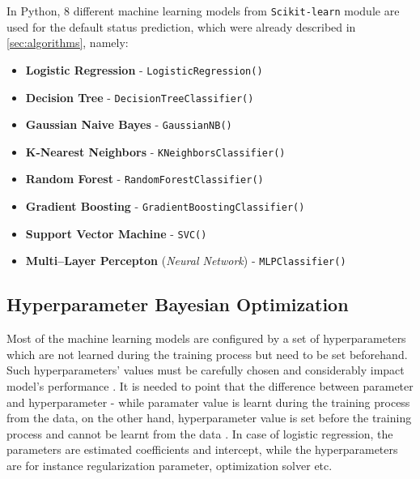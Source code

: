 In Python, 8 different machine learning models from \lstinline{Scikit-learn} module are used for the default status prediction, which were already described in \autoref{sec:algorithms}, namely:
\begin{itemize}\setlength\itemsep{0em}
\item \textbf{Logistic Regression} - \lstinline{LogisticRegression()}
\item \textbf{Decision Tree} - \lstinline{DecisionTreeClassifier()}
\item \textbf{Gaussian Naive Bayes} - \lstinline{GaussianNB()}
\item \textbf{K-Nearest Neighbors} - \lstinline{KNeighborsClassifier()}
\item \textbf{Random Forest} - \lstinline{RandomForestClassifier()}
\item \textbf{Gradient Boosting} - \lstinline{GradientBoostingClassifier()}
\item \textbf{Support Vector Machine} - \lstinline{SVC()}
\item \textbf{Multi--Layer Percepton} (\textit{Neural Network}) - \lstinline{MLPClassifier()}
\end{itemize}

\subsection{Hyperparameter Bayesian Optimization}

Most of the machine learning models are configured by a set of hyperparameters which are not learned during the training process but need to be set beforehand. Such hyperparameters' values must be carefully chosen and considerably impact model's performance \citep{bischl2023hyperparameter}.
It is needed to point that the difference between parameter and hyperparameter - while paramater value is learnt during the training process from the data, on the other hand, hyperparameter value is set before the training process and cannot be learnt from the data \citep{owen2022hyperparameter}. In case of logistic regression, the parameters are estimated coefficients and intercept, while the hyperparameters are for instance regularization parameter, optimization solver etc.

